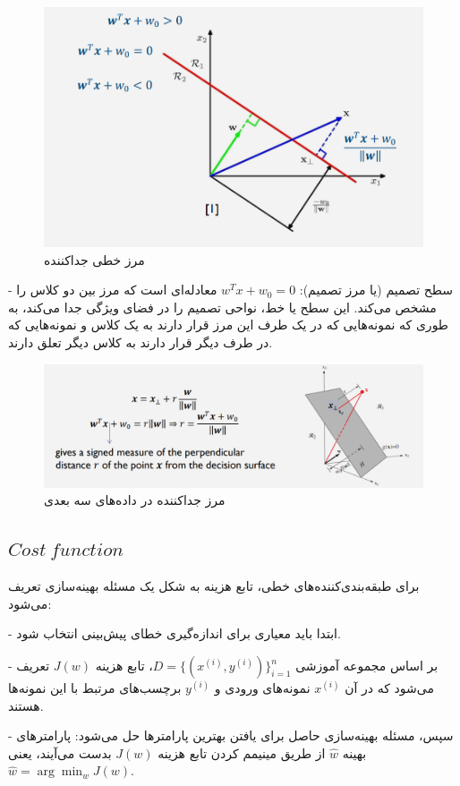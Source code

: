 \documentclass[12pt]{article}
\begin{document}
\begin{figure}
    \centering
    \includegraphics[width=0.5\linewidth]{image.png}
    \caption{مرز خطی جداکننده}
    \label{fig:enter-label}
\label{fig:f1}
\end{figure}

- سطح تصمیم (یا مرز تصمیم): \(w^Tx + w_0 = 0\) معادله‌ای است که مرز بین دو کلاس را مشخص می‌کند. این سطح یا خط، نواحی تصمیم را در فضای ویژگی جدا می‌کند، به طوری که نمونه‌هایی که در یک طرف این مرز قرار دارند به یک کلاس و نمونه‌هایی که در طرف دیگر قرار دارند به کلاس دیگر تعلق دارند.

\begin{figure}
    \centering
    \includegraphics[width=1\linewidth]{image2.png}
    \caption{مرز جداکننده در داده‌های سه بعدی}
    \label{fig:enter-label}
\label{fig:f1}
\end{figure}

 \subsection{
$Cost\:function$ }

برای طبقه‌بندی‌کننده‌های خطی، تابع هزینه به شکل یک مسئله بهینه‌سازی تعریف می‌شود:

- ابتدا باید معیاری برای اندازه‌گیری خطای پیش‌بینی انتخاب شود.

- بر اساس مجموعه آموزشی \( D = \{(x^{(i)}, y^{(i)})\}^n_{i=1} \)، تابع هزینه \( J(w) \) تعریف می‌شود که در آن \( x^{(i)} \) نمونه‌های ورودی و \( y^{(i)} \) برچسب‌های مرتبط با این نمونه‌ها هستند.

- سپس، مسئله بهینه‌سازی حاصل برای یافتن بهترین پارامترها حل می‌شود: پارامترهای بهینه \( \hat{w} \) از طریق مینیمم کردن تابع هزینه \( J(w) \) بدست می‌آیند، یعنی \( \hat{w} = \arg\min_w J(w) \).
\end{document}
